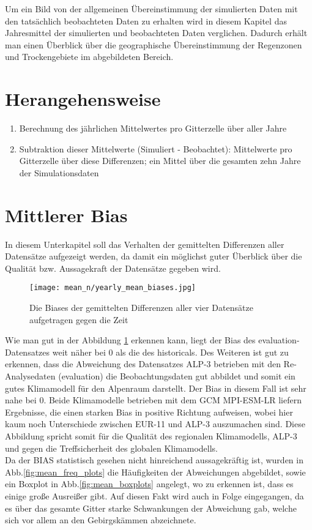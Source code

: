 Um ein Bild von der allgemeinen Übereinstimmung der simulierten Daten mit den tatsächlich beobachteten Daten zu erhalten wird in diesem Kapitel das Jahresmittel der simulierten und beobachteten Daten verglichen. Dadurch erhält man einen Überblick über die geographische Übereinstimmung der Regenzonen und Trockengebiete im abgebildeten Bereich.
\section{Herangehensweise}
\begin{enumerate}
	\item Berechnung des jährlichen Mittelwertes pro Gitterzelle über aller Jahre
	\item Subtraktion dieser Mittelwerte (Simuliert - Beobachtet): Mittelwerte pro Gitterzelle über diese Differenzen; ein Mittel über die gesamten zehn Jahre der Simulationsdaten	
\end{enumerate}
\section{Mittlerer Bias}
In diesem Unterkapitel soll das Verhalten der gemittelten Differenzen aller Datensätze aufgezeigt werden, da damit ein möglichst guter Überblick über die Qualität bzw. Aussagekraft der Datensätze gegeben wird.
\begin{figure}[h]
	\texttt{[image: mean\_n/yearly\_mean\_biases.jpg]}
	\caption{Die Biases der gemittelten Differenzen aller vier Datensätze aufgetragen gegen die Zeit}
	\label{fig:yearly_mean_biases}
\end{figure}
Wie man gut in der Abbildung \ref{fig:yearly_mean_biases} erkennen kann, liegt der Bias des evaluation-Datensatzes weit näher bei 0 als die des historicals. Des Weiteren ist gut zu erkennen, dass die Abweichung des Datensatzes ALP-3 betrieben mit den Re-Analysedaten (evaluation) die Beobachtungsdaten gut abbildet und somit ein gutes Klimamodell für den Alpenraum darstellt. Der Bias in diesem Fall ist sehr nahe bei 0. Beide Klimamodelle betrieben mit dem GCM MPI-ESM-LR liefern Ergebnisse, die einen starken Bias in positive Richtung aufweisen, wobei hier kaum noch Unterschiede zwischen EUR-11 und ALP-3 auszumachen sind. Diese Abbildung spricht somit für die Qualität des regionalen Klimamodells, ALP-3 und gegen die Treffsicherheit des globalen Klimamodells.\\
Da der BIAS statistisch gesehen nicht hinreichend aussagekräftig ist, wurden in Abb.\ref{fig:mean_freq_plots} die Häufigkeiten der Abweichungen abgebildet, sowie ein Boxplot in Abb.\ref{fig:mean_boxplots} angelegt, wo zu erkennen ist, dass es einige große Ausreißer gibt. Auf diesen Fakt wird auch in Folge eingegangen, da es über das gesamte Gitter starke Schwankungen der Abweichung gab, welche sich vor allem an den Gebirgskämmen abzeichnete.\\

